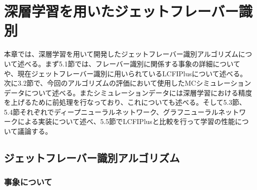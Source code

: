 


\chapter{深層学習を用いたジェットフレーバー識別} \label{sec:Flavortagging}
本章では、深層学習を用いて開発したジェットフレーバー識別アルゴリズムについて述べる。まず5.1節では、フレーバー識別に関係する事象の詳細についてや、現在ジェットフレーバー識別に用いられているLCFIPlusについて述べる。次に3.2節で、今回のアルゴリズムの評価において使用したMCシミュレーションデータについて述べる。またシミュレーションデータには深層学習における精度を上げるために前処理を行なっており、これについても述べる。そして5.3節、5.4節それぞれでディープニューラルネットワーク、グラフニューラルネットワークによる実装について述べ、5.5節でLCFIPlusと比較を行って学習の性能について議論する。
\section{ジェットフレーバー識別アルゴリズム}
\subsection{事象について}

